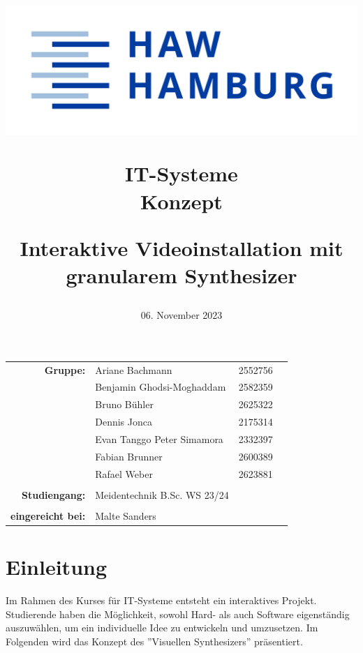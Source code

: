 \documentclass[12pt]{scrartcl}%
\title{
\begin{flushright}
 \includegraphics[scale=0.5]{HAW_Marke_RGB_300dpi.jpg}
\end{flushright}

\vspace{2cm}

IT-Systeme\\
Konzept
 
\vspace{1cm}

\LARGE Interaktive Videoinstallation mit\\
granularem Synthesizer
}
\date{06.  November 2023}
\theoremstyle{nonumberplain}
\begin{document}
\begin{titlepage}


\maketitle %


\vfill 

\begin{flushleft}
\begin{tabular}{rlll}
\textbf{Gruppe:} & Ariane Bachmann & 2552756 & \hspace{5cm} \\
 & Benjamin Ghodsi-Moghaddam & 2582359 & \hspace{5cm} \\
 & Bruno Bühler & 2625322 & \hspace{5cm} \\
  & Dennis Jonca & 2175314 & \hspace{5cm} \\
   & Evan Tanggo Peter Simamora & 2332397 & \hspace{5cm} \\
    & Fabian Brunner &  2600389 & \hspace{5cm} \\
& Rafael Weber & 2623881 & \hspace{5cm} \\\\
\textbf{Studiengang:} & Meidentechnik B.Sc. WS 23/24 & \hspace{5cm} \\\\
\textbf{eingereicht bei:} & Malte Sanders & \hspace{5cm} \\ 
\end{tabular}
\end{flushleft}

\end{titlepage}

\tableofcontents

\newpage

\section{Einleitung}

Im Rahmen des Kurses für IT-Systeme entsteht ein interaktives Projekt. Studierende haben die Möglichkeit, sowohl Hard- als auch Software eigenständig auszuwählen, um ein individuelle Idee zu entwickeln und umzusetzen. Im Folgenden wird das Konzept des ''Visuellen Synthesizers'' präsentiert.
\end{document}
